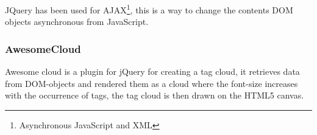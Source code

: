 JQuery has been used for AJAX\footnote{Asynchronous JavaScript and XML}, this is a way to change the contents DOM objects asynchronous from JavaScript.

\subsubsection{AwesomeCloud}
Awesome cloud is a plugin for jQuery for creating a tag cloud, it retrieves data from DOM-objects and rendered them as a cloud where the font-size increases with the occurrence of tags, the tag cloud is then drawn on the HTML5 canvas.
